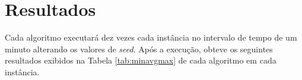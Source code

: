 \documentclass[portugues, brazil, a4paper,12pt]{article}
\begin{document}

\section{Resultados}
	Cada algoritmo executará dez vezes cada instância no intervalo de tempo de um minuto alterando os valores de \textit{seed}. Após a execução, obteve os seguintes resultados exibidos na Tabela \ref{tab:minavgmax} de cada algoritmo em cada instância.
\end{document}
